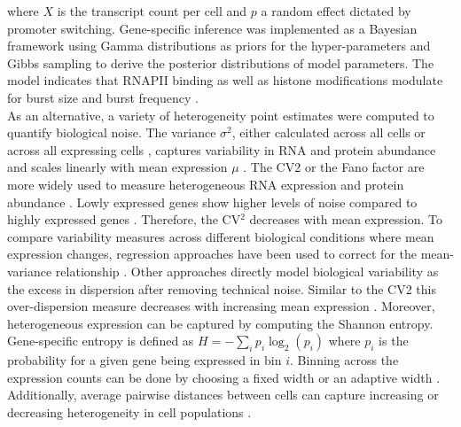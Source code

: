 where $X$ is the transcript count per cell and $p$ a random effect dictated by promoter switching. Gene-specific inference was implemented as a Bayesian framework using Gamma distributions as priors for the hyper-parameters and Gibbs sampling to derive the posterior distributions of model parameters. The model indicates that RNAPII binding as well as histone modifications modulate for burst size and burst frequency \citep{Kim2013}. \\

As an alternative, a variety of heterogeneity point estimates were computed to quantify biological noise. The variance $\sigma^2$, either calculated across all cells or across all expressing cells \citep{Shalek2014}, captures variability in RNA and protein abundance and scales linearly with mean expression $\mu$ \citep{Dey2015a}. The \gls{CV2} or the Fano factor are more widely used to measure heterogeneous RNA expression \citep{Brennecke2013, Jones2014} and protein abundance \citep{Newman2006}. Lowly expressed genes show higher levels of noise compared to highly expressed genes \citep{Brennecke2013}. Therefore, the CV$^2$ decreases with mean expression. To compare variability measures across different biological conditions where mean expression changes, regression approaches have been used to correct for the mean-variance relationship \citep{Kolodziejczyk2015cell, Fan2016}. Other approaches directly model biological variability as the excess in dispersion after removing technical noise. Similar to the \gls{CV2} \citep{Brennecke2013} this over-dispersion measure decreases with increasing mean expression \citep{Vallejos2015BASiCS}. Moreover, heterogeneous expression can be captured by computing the Shannon entropy. Gene-specific entropy is defined as $H=-\sum_i{}p_i\log_2(p_i)$ where $p_i$ is the probability for a given gene being expressed in bin $i$. Binning across the expression counts can be done by choosing a fixed width \citep{Richard2016} or an adaptive width \citep{Stumpf2017}. Additionally, average pairwise distances between cells can capture increasing or decreasing heterogeneity in cell populations \citep{Mohammed2017}. \\ 
